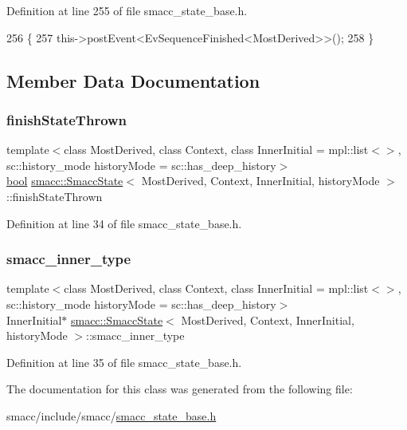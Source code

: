 Definition at line 255 of file smacc\+\_\+state\+\_\+base.\+h.


\begin{DoxyCode}
256     \{
257       this->postEvent<EvSequenceFinished<MostDerived>>();
258     \}
\end{DoxyCode}


\subsection{Member Data Documentation}
\mbox{\label{classsmacc_1_1SmaccState_a6c40f733c35ddfb9ae2a2f8e9bab07d3}} 
\subsubsection{\texorpdfstring{finish\+State\+Thrown}{finishStateThrown}}
{\footnotesize\ttfamily template$<$class Most\+Derived, class Context, class Inner\+Initial = mpl\+::list$<$$>$, sc\+::history\+\_\+mode history\+Mode = sc\+::has\+\_\+deep\+\_\+history$>$ \\
\hyperlink{classbool}{bool} \hyperlink{classsmacc_1_1SmaccState}{smacc\+::\+Smacc\+State}$<$ Most\+Derived, Context, Inner\+Initial, history\+Mode $>$\+::finish\+State\+Thrown}



Definition at line 34 of file smacc\+\_\+state\+\_\+base.\+h.

\mbox{\label{classsmacc_1_1SmaccState_a087d0f66729b98614feb8c59ea548af1}} 
\subsubsection{\texorpdfstring{smacc\+\_\+inner\+\_\+type}{smacc\_inner\_type}}
{\footnotesize\ttfamily template$<$class Most\+Derived, class Context, class Inner\+Initial = mpl\+::list$<$$>$, sc\+::history\+\_\+mode history\+Mode = sc\+::has\+\_\+deep\+\_\+history$>$ \\
Inner\+Initial$\ast$ \hyperlink{classsmacc_1_1SmaccState}{smacc\+::\+Smacc\+State}$<$ Most\+Derived, Context, Inner\+Initial, history\+Mode $>$\+::smacc\+\_\+inner\+\_\+type}



Definition at line 35 of file smacc\+\_\+state\+\_\+base.\+h.



The documentation for this class was generated from the following file\+:\begin{DoxyCompactItemize}
\item 
smacc/include/smacc/\hyperlink{smacc__state__base_8h}{smacc\+\_\+state\+\_\+base.\+h}\end{DoxyCompactItemize}
